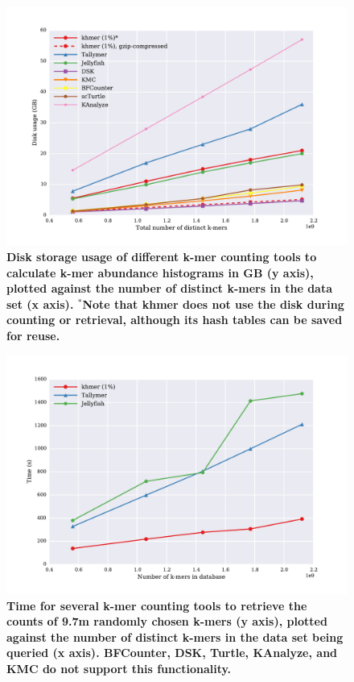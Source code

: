 \documentclass[10pt]{article}
\begin{document}
\begin{figure}[!ht]
\centerline{\includegraphics[width=5in]{./figure/disk_benchmark}}

\caption{\bf Disk storage usage of different k-mer counting tools to
  calculate k-mer abundance histograms in GB (y axis), plotted against
  the number of distinct k-mers in the data set (x axis).  $^*$Note
  that khmer does not use the disk during counting or retrieval,
  although its hash tables can be saved for reuse.}

\label{fig:cmp_disk}
\end{figure}

\begin{figure}[!ht]
\centerline{\includegraphics[width=5in]{./figure/count_benchmark}}
\caption{\bf Time for several k-mer counting tools to retrieve the
  counts of 9.7m randomly chosen k-mers (y axis), plotted against the
  number of distinct k-mers in the data set being queried (x axis).
  BFCounter, DSK, Turtle, KAnalyze, and KMC do not support this functionality.}
\label{fig:cmp_count}
\end{figure}
\end{document}
